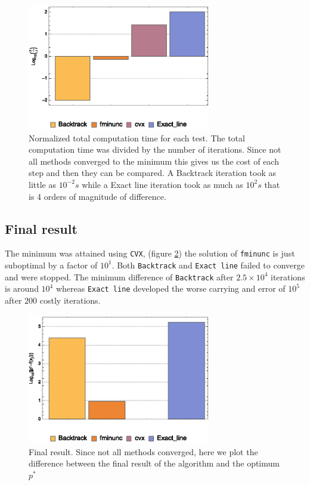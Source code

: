\documentclass[a4paper,8pt,twocolumn]{article}
\begin{document}
\begin{figure}[!ht]
\begin{center}
\includegraphics[width=8cm]{f1.eps}
\caption{\footnotesize{Normalized total computation time for each test. The total computation time was divided by the number of iterations. Since not all methods converged to the minimum this gives us the cost of each step and then they can be compared. A Backtrack iteration took as little as $10^{-2}s$ while a Exact line iteration took as much as $10^2s$ that is 4 orders of magnitude of difference. \label{f1}}}
\end{center}
\end{figure}

\subsection*{Final result}
The minimum was attained using \texttt{CVX}, (figure \ref{f2}) the solution of \texttt{fminunc} is just suboptimal by a factor of $10^1$. Both \texttt{Backtrack} and \texttt{Exact line} failed to converge and were stopped. The minimum difference of \texttt{Backtrack} after $2.5\times 10^4$ iterations is around $10^4$ whereas \texttt{Exact line} developed the worse carrying and error of $10^5$ after $200$ costly iterations.

\begin{figure}[!ht]
\begin{center}
\includegraphics[width=8cm]{f2.eps}
\caption{\footnotesize{Final result. Since not all methods converged, here we plot the difference between the final result of the algorithm and the optimum $p^*$ }\label{f2}}
\end{center}
\end{figure}
\end{document}
